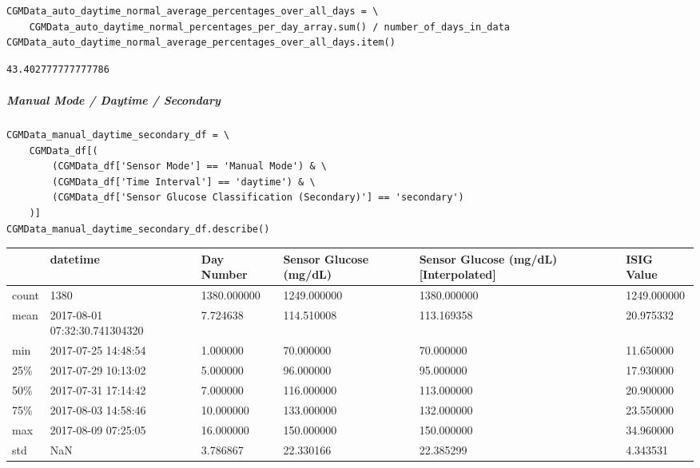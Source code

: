 \begin{verbatim}
CGMData_auto_daytime_normal_average_percentages_over_all_days = \
    CGMData_auto_daytime_normal_percentages_per_day_array.sum() / number_of_days_in_data
CGMData_auto_daytime_normal_average_percentages_over_all_days.item()
\end{verbatim}

\begin{verbatim}
43.402777777777786
\end{verbatim}

\subparagraph{Manual Mode / Daytime / Secondary}

\begin{verbatim}
CGMData_manual_daytime_secondary_df = \
    CGMData_df[(
        (CGMData_df['Sensor Mode'] == 'Manual Mode') & \
        (CGMData_df['Time Interval'] == 'daytime') & \
        (CGMData_df['Sensor Glucose Classification (Secondary)'] == 'secondary')
    )]
CGMData_manual_daytime_secondary_df.describe()
\end{verbatim}

\bigskip\noindent
\begin{tabular}{p{}p{}p{}p{}p{}p{}}
\toprule
 & datetime & Day Number & Sensor Glucose (mg/dL) & Sensor Glucose (mg/dL) [Interpolated] & ISIG Value \\
\hline
count & 1380 & 1380.000000 & 1249.000000 & 1380.000000 & 1249.000000 \\
\hline
mean & 2017-08-01 07:32:30.741304320 & 7.724638 & 114.510008 & 113.169358 & 20.975332 \\
\hline
min & 2017-07-25 14:48:54 & 1.000000 & 70.000000 & 70.000000 & 11.650000 \\
\hline
25\% & 2017-07-29 10:13:02 & 5.000000 & 96.000000 & 95.000000 & 17.930000 \\
\hline
50\% & 2017-07-31 17:14:42 & 7.000000 & 116.000000 & 113.000000 & 20.900000 \\
\hline
75\% & 2017-08-03 14:58:46 & 10.000000 & 133.000000 & 132.000000 & 23.550000 \\
\hline
max & 2017-08-09 07:25:05 & 16.000000 & 150.000000 & 150.000000 & 34.960000 \\
\hline
std & NaN & 3.786867 & 22.330166 & 22.385299 & 4.343531 \\
\hline
\bottomrule
\end{tabular}


